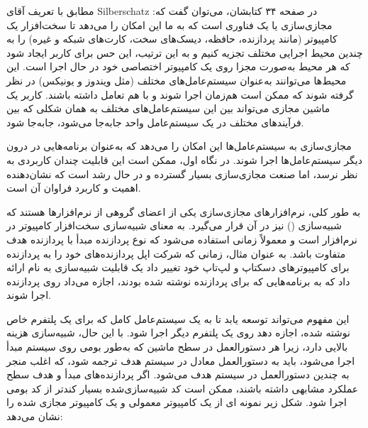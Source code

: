 \begin{enumerate}
	\begin{qsolve}
		مطابق با تعریف آقای \lr{}Silberschatz در صفحه ۳۴ کتابشان، می‌توان گفت که: مجازی‌سازی یا  یک فناوری است که به ما این امکان را می‌دهد تا سخت‌افزار یک کامپیوتر (مانند پردازنده، حافظه، دیسک‌های سخت، کارت‌های شبکه و غیره) را به چندین محیط اجرایی مختلف تجزیه کنیم و به این ترتیب، این حس برای کاربر ایجاد شود که هر محیط به‌صورت مجزا روی یک کامپیوتر اختصاصی خود در حال اجرا است. این محیط‌ها می‌توانند به‌عنوان سیستم‌عامل‌های مختلف (مثل ویندوز و یونیکس) در نظر گرفته شوند که ممکن است هم‌زمان اجرا شوند و با هم تعامل داشته باشند. کاربر یک ماشین مجازی می‌تواند بین این سیستم‌عامل‌های مختلف به همان شکلی که بین فرآیندهای مختلف در یک سیستم‌عامل واحد جابه‌جا می‌شود، جابه‌جا شود.
		
		مجازی‌سازی به سیستم‌عامل‌ها این امکان را می‌دهد که به‌عنوان برنامه‌هایی در درون دیگر سیستم‌عامل‌ها اجرا شوند. در نگاه اول، ممکن است این قابلیت چندان کاربردی به نظر نرسد، اما صنعت مجازی‌سازی بسیار گسترده و در حال رشد است که نشان‌دهنده اهمیت و کاربرد فراوان آن است.
		
		به طور کلی، نرم‌افزارهای مجازی‌سازی یکی از اعضای گروهی از نرم‌افزارها هستند که شبیه‌سازی () نیز در آن قرار می‌گیرد.  به معنای شبیه‌سازی سخت‌افزار کامپیوتر در نرم‌افزار است و معمولاً زمانی استفاده می‌شود که نوع پردازنده مبدأ با پردازنده هدف متفاوت باشد. به عنوان مثال، زمانی که شرکت اپل پردازنده‌های  خود را به پردازنده  برای کامپیوترهای دسکتاپ و لپ‌تاپ خود تغییر داد یک قابلیت شبیه‌سازی به نام  ارائه داد که به برنامه‌هایی که برای پردازنده  نوشته شده بودند، اجازه می‌داد روی پردازنده  اجرا شوند. 
		
	\end{qsolve}
	
	
	
	\begin{qsolve}
			این مفهوم می‌تواند توسعه یابد تا به یک سیستم‌عامل کامل که برای یک پلتفرم خاص نوشته شده، اجازه دهد روی یک پلتفرم دیگر اجرا شود. با این حال، شبیه‌سازی هزینه بالایی دارد، زیرا هر دستورالعمل در سطح ماشین که به‌طور بومی روی سیستم مبدأ اجرا می‌شود، باید به دستورالعمل معادل در سیستم هدف ترجمه شود، که اغلب منجر به چندین دستورالعمل در سیستم هدف می‌شود. اگر پردازنده‌های مبدأ و هدف سطح عملکرد مشابهی داشته باشند، ممکن است کد شبیه‌سازی‌شده بسیار کندتر از کد بومی اجرا شود. شکل زیر نمونه ای از یک کامپیوتر معمولی و یک کامپیوتر مجازی شده را نشان می‌دهد:
			

\end{qsolve}
\end{enumerate}
